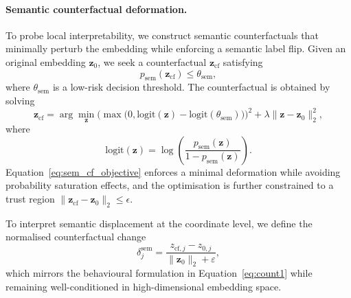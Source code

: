 \documentclass[lettersize,journal]{IEEEtran}
\begin{document}
\paragraph{Semantic counterfactual deformation.}
To probe local interpretability, we construct semantic counterfactuals that minimally perturb the embedding while enforcing a semantic label flip.
Given an original embedding $\mathbf{z}_0$, we seek a counterfactual
$\mathbf{z}_{\mathrm{cf}}$ satisfying
\begin{equation}
p_{\mathrm{sem}}(\mathbf{z}_{\mathrm{cf}}) \le \theta_{\mathrm{sem}},
\label{eq:sem_cf_condition}
\end{equation}
where $\theta_{\mathrm{sem}}$ is a low-risk decision threshold.
The counterfactual is obtained by solving
\begin{equation}
\mathbf{z}_{\mathrm{cf}}
=
\arg\min_{\mathbf{z}}
\Big(
\max\!\big(0, \mathrm{logit}(\mathbf{z}) - \mathrm{logit}(\theta_{\mathrm{sem}})\big)
\Big)^2
+
\lambda \lVert \mathbf{z} - \mathbf{z}_0 \rVert_2^2,
\label{eq:sem_cf_objective}
\end{equation}
where
\begin{equation}
\mathrm{logit}(\mathbf{z}) =
\log\!\left(
\frac{p_{\mathrm{sem}}(\mathbf{z})}{1 - p_{\mathrm{sem}}(\mathbf{z})}
\right).
\label{eq:sem_logit}
\end{equation}
Equation~\eqref{eq:sem_cf_objective} enforces a minimal deformation while avoiding probability
saturation effects, and the optimisation is further constrained to a trust region
$\lVert \mathbf{z}_{\mathrm{cf}} - \mathbf{z}_0 \rVert_2 \le \epsilon$.

To interpret semantic displacement at the coordinate level, we define the normalised counterfactual change
\begin{equation}
\delta^{\mathrm{sem}}_j =
\frac{z_{\mathrm{cf},j} - z_{0,j}}{\lVert \mathbf{z}_0 \rVert_2 + \varepsilon},
\label{eq:sem_delta}
\end{equation}
which mirrors the behavioural formulation in Equation~\eqref{eq:count1} while remaining well-conditioned in high-dimensional embedding space.

\vspace{0.3em}
\end{document}
